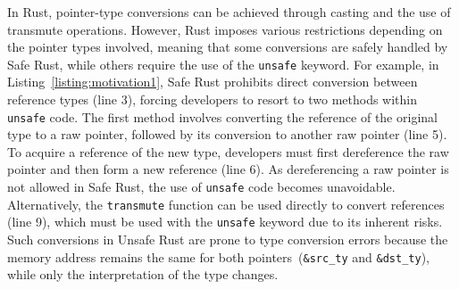 \vspace{0.05in}
In Rust, pointer-type conversions can be achieved through casting and the use of transmute operations. However, Rust imposes various restrictions depending on the pointer types involved, meaning that some conversions are safely handled by Safe Rust, while others require the use of the \texttt{unsafe} keyword. For example, in Listing~\ref{listing:motivation1}, Safe Rust prohibits direct conversion between reference types (line 3), forcing developers to resort to two methods within \texttt{unsafe} code. The first method involves converting the reference of the original type to a raw pointer, followed by its conversion to another raw pointer (line 5). To acquire a reference of the new type, developers must first dereference the raw pointer and then form a new reference (line 6). As dereferencing a raw pointer is not allowed in Safe Rust, the use of \texttt{unsafe} code becomes unavoidable. Alternatively, the \texttt{transmute} function can be used directly to convert references (line 9), which must be used with the \texttt{unsafe} keyword due to its inherent risks. Such conversions in Unsafe Rust are prone to type conversion errors because the memory address remains the same for both pointers~(\texttt{\&src\_ty} and \texttt{\&dst\_ty}), while only the interpretation of the type changes.




